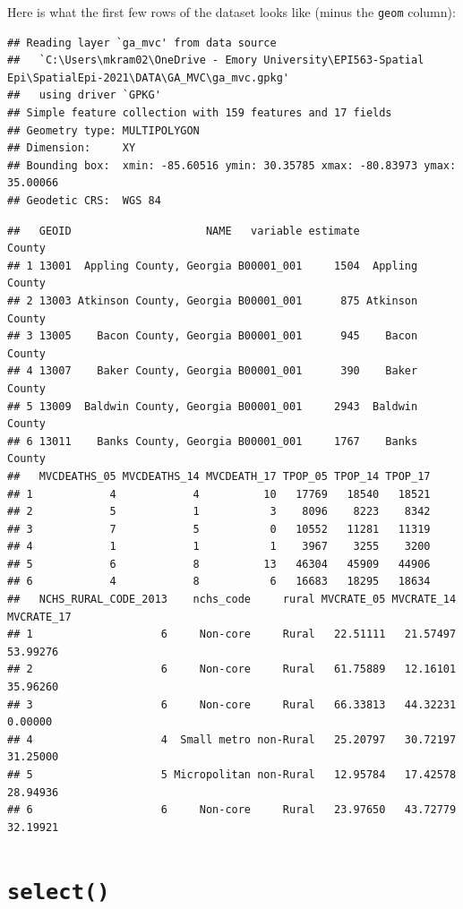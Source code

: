 \documentclass[
]{book}
\begin{document}
Here is what the first few rows of the dataset looks like (minus the \texttt{geom} column):

\begin{verbatim}
## Reading layer `ga_mvc' from data source 
##   `C:\Users\mkram02\OneDrive - Emory University\EPI563-Spatial Epi\SpatialEpi-2021\DATA\GA_MVC\ga_mvc.gpkg' 
##   using driver `GPKG'
## Simple feature collection with 159 features and 17 fields
## Geometry type: MULTIPOLYGON
## Dimension:     XY
## Bounding box:  xmin: -85.60516 ymin: 30.35785 xmax: -80.83973 ymax: 35.00066
## Geodetic CRS:  WGS 84
\end{verbatim}

\begin{verbatim}
##   GEOID                     NAME   variable estimate          County
## 1 13001  Appling County, Georgia B00001_001     1504  Appling County
## 2 13003 Atkinson County, Georgia B00001_001      875 Atkinson County
## 3 13005    Bacon County, Georgia B00001_001      945    Bacon County
## 4 13007    Baker County, Georgia B00001_001      390    Baker County
## 5 13009  Baldwin County, Georgia B00001_001     2943  Baldwin County
## 6 13011    Banks County, Georgia B00001_001     1767    Banks County
##   MVCDEATHS_05 MVCDEATHS_14 MVCDEATH_17 TPOP_05 TPOP_14 TPOP_17
## 1            4            4          10   17769   18540   18521
## 2            5            1           3    8096    8223    8342
## 3            7            5           0   10552   11281   11319
## 4            1            1           1    3967    3255    3200
## 5            6            8          13   46304   45909   44906
## 6            4            8           6   16683   18295   18634
##   NCHS_RURAL_CODE_2013    nchs_code     rural MVCRATE_05 MVCRATE_14 MVCRATE_17
## 1                    6     Non-core     Rural   22.51111   21.57497   53.99276
## 2                    6     Non-core     Rural   61.75889   12.16101   35.96260
## 3                    6     Non-core     Rural   66.33813   44.32231    0.00000
## 4                    4  Small metro non-Rural   25.20797   30.72197   31.25000
## 5                    5 Micropolitan non-Rural   12.95784   17.42578   28.94936
## 6                    6     Non-core     Rural   23.97650   43.72779   32.19921
\end{verbatim}

\hypertarget{select}{%
\section{\texorpdfstring{\texttt{select()}}{select()}}\label{select}}
\end{document}
